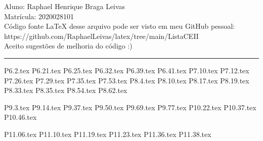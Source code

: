 \documentclass[12pt]{scrartcl}
\begin{document}
\pagestyle{fancy}

\fancyhead{}
\fancyfoot{}

\begin{center}
    Aluno: Raphael Henrique Braga Leivas \\
    Matrícula: 2020028101 \\[20pt]
    Código fonte LaTeX desse arquivo pode ser visto em meu GitHub pessoal: \\
    https://github.com/RaphaelLeivas/latex/tree/main/ListaCEII \\[10pt]
    Aceito sugestões de melhoria do código :)
\end{center}

\hrule

{P6.2.tex}
{P6.21.tex}
{P6.25.tex}
{P6.32.tex}
{P6.39.tex}
{P6.41.tex}
{P7.10.tex}
{P7.12.tex}
{P7.26.tex}
{P7.29.tex}
{P7.35.tex}
{P7.53.tex}
{P8.4.tex}
{P8.10.tex}
{P8.17.tex}
{P8.19.tex}
{P8.33.tex}
{P8.35.tex}
{P8.54.tex}
{P8.62.tex}

{P9.3.tex}
{P9.14.tex}
{P9.37.tex}
{P9.50.tex}
{P9.69.tex}
{P9.77.tex}
{P10.22.tex}
{P10.37.tex}
{P10.46.tex}

{P11.06.tex}
{P11.10.tex}
{P11.19.tex}
{P11.23.tex}
{P11.36.tex}
{P11.38.tex}
\end{document}
